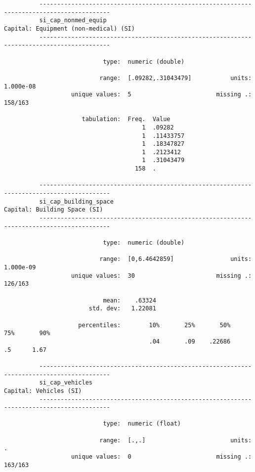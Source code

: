 \documentclass{article}
\begin{document}
\begin{verbatim}
          ------------------------------------------------------------------------------------------
          si_cap_nonmed_equip                                  Capital: Equipment (non-medical) (SI)
          ------------------------------------------------------------------------------------------
          
                            type:  numeric (double)
          
                           range:  [.09282,.31043479]           units:  1.000e-08
                   unique values:  5                        missing .:  158/163
          
                      tabulation:  Freq.  Value
                                       1  .09282
                                       1  .11433757
                                       1  .18347827
                                       1  .2123412
                                       1  .31043479
                                     158  .
          
          ------------------------------------------------------------------------------------------
          si_cap_building_space                                         Capital: Building Space (SI)
          ------------------------------------------------------------------------------------------
          
                            type:  numeric (double)
          
                           range:  [0,6.4642859]                units:  1.000e-09
                   unique values:  30                       missing .:  126/163
          
                            mean:    .63324
                        std. dev:   1.22081
          
                     percentiles:        10%       25%       50%       75%       90%
                                         .04       .09    .22686        .5      1.67
          
          ------------------------------------------------------------------------------------------
          si_cap_vehicles                                                     Capital: Vehicles (SI)
          ------------------------------------------------------------------------------------------
          
                            type:  numeric (float)
          
                           range:  [.,.]                        units:  .
                   unique values:  0                        missing .:  163/163
          

\end{verbatim}
\end{document}

